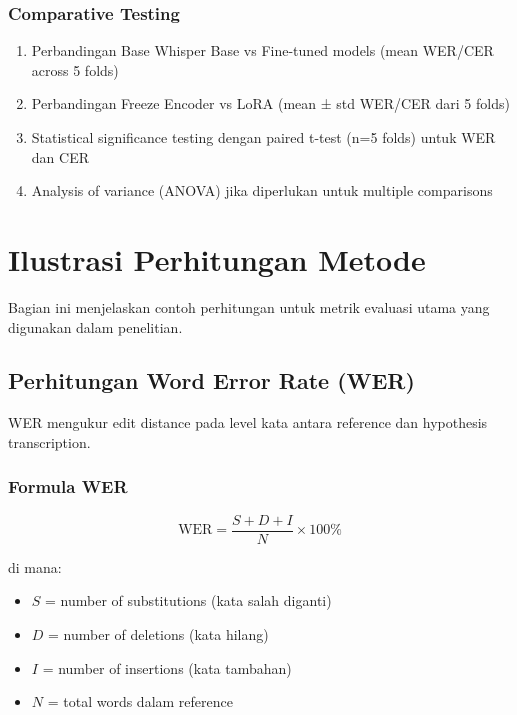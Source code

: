 \subsubsection{Comparative Testing}

\begin{enumerate}[noitemsep]
    \item Perbandingan Base Whisper Base vs Fine-tuned models (mean WER/CER across 5 folds)
    \item Perbandingan Freeze Encoder vs LoRA (mean ± std WER/CER dari 5 folds)
    \item Statistical significance testing dengan paired t-test (n=5 folds) untuk WER dan CER
    \item Analysis of variance (ANOVA) jika diperlukan untuk multiple comparisons
\end{enumerate}

\section{Ilustrasi Perhitungan Metode}
\label{III.Ilustrasi}

Bagian ini menjelaskan contoh perhitungan untuk metrik evaluasi utama yang digunakan dalam penelitian.

\subsection{Perhitungan Word Error Rate (WER)}
\label{III.Ilustrasi_WER}

WER mengukur edit distance pada level kata antara reference dan hypothesis transcription.

\subsubsection{Formula WER}

\vspace{0.3cm}
\begin{equation}
\label{eq:wer_def}
\text{WER} = \frac{S + D + I}{N} \times 100\%
\end{equation}
\vspace{0.2cm}

\noindent
di mana:
\begin{itemize}[noitemsep]
    \item $S$ = number of substitutions (kata salah diganti)
    \item $D$ = number of deletions (kata hilang)
    \item $I$ = number of insertions (kata tambahan)
    \item $N$ = total words dalam reference
\end{itemize}

